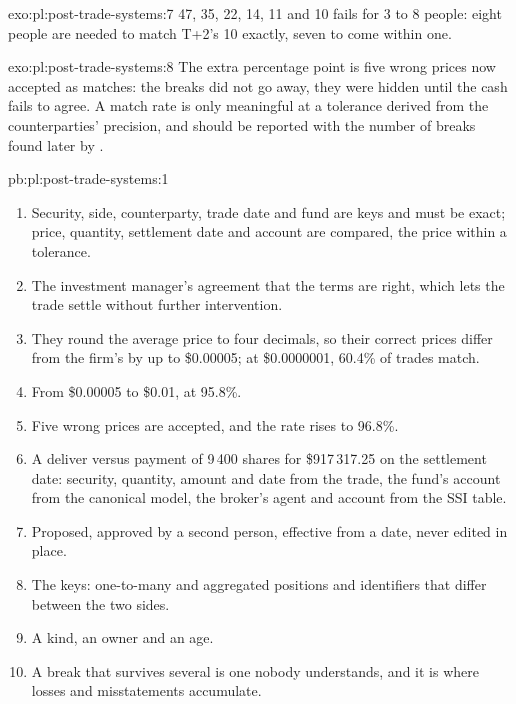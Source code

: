 \begin{solution}{exo:pl:post-trade-systems:7}
47, 35, 22, 14, 11 and 10 fails for 3 to 8 people: eight people are needed to match T+2's 10 exactly, seven to come within one.
\end{solution}

\begin{solution}{exo:pl:post-trade-systems:8}
The extra percentage point is five wrong prices now accepted as matches: the breaks did not go away, they were hidden until the cash fails
to agree. A match rate is only meaningful at a tolerance derived from the counterparties' precision, and should be reported with the number of
breaks found later by .
\end{solution}

\begin{solution}{pb:pl:post-trade-systems:1}
\begin{enumerate}
\item Security, side, counterparty, trade date and fund are keys and must be exact; price, quantity, settlement date and account are compared,
the price within a tolerance.
\item The investment manager's agreement that the terms are right, which lets the trade settle without further intervention.
\item They round the average price to four decimals, so their correct prices differ from the firm's by up to \$0.00005; at \$0.0000001, 60.4\%
of trades match.
\item From \$0.00005 to \$0.01, at 95.8\%.
\item Five wrong prices are accepted, and the rate rises to 96.8\%.
\item A deliver versus payment of 9\,400 shares for \$917\,317.25 on the settlement date: security, quantity, amount and date from the trade,
the fund's account from the canonical model, the broker's agent and account from the SSI table.
\item Proposed, approved by a second person, effective from a date, never edited in place.
\item The keys: one-to-many and aggregated positions and identifiers that differ between the two sides.
\item A kind, an owner and an age.
\item A break that survives several  is one nobody understands, and it is where losses and misstatements accumulate.

\end{enumerate}
\end{solution}
